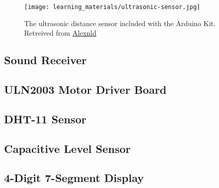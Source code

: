     \begin{figure}[h]
        \texttt{[image: learning\_materials/ultrasonic-sensor.jpg]}
        \caption[Ultrasonic Sensor]{The ultrasonic distance sensor included with the Arduino Kit. 
        Retreived from \href{https://alexnld.com/wp-content/uploads/2017/12/DIY4002_1.jpg}
        {Alexnld}}
    \end{figure}

    \subsection*{Sound Receiver}


    \subsection*{ULN2003 Motor Driver Board}


    \subsection*{DHT-11 Sensor}


    \subsection*{Capacitive Level Sensor}


    \subsection*{4-Digit 7-Segment Display}
